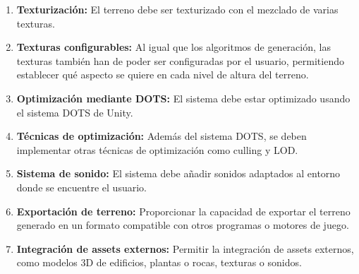 \begin{enumerate}
                \item \textbf{Texturización:} El terreno debe ser texturizado con el mezclado de varias texturas. 
                \item \textbf{Texturas configurables:} Al igual que los algoritmos de generación, las texturas también han de poder ser configuradas por el usuario, permitiendo establecer qué aspecto se quiere en cada nivel de altura del terreno.
                \item \textbf{Optimización mediante DOTS: }El sistema debe estar optimizado usando el sistema DOTS de Unity.
                \item \textbf{Técnicas de optimización: } Además del sistema DOTS, se deben implementar otras técnicas de optimización como culling y LOD.
                \item \textbf{Sistema de sonido: }El sistema debe añadir sonidos adaptados al entorno donde se encuentre el usuario.
                \item \textbf{Exportación de terreno:} Proporcionar la capacidad de exportar el terreno generado en un formato compatible con otros programas o motores de juego.
                \item \textbf{Integración de assets externos:} Permitir la integración de assets externos, como modelos 3D de edificios, plantas o rocas, texturas o sonidos.
            
            \end{enumerate}
